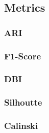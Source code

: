 \subsection{Metrics}

\subsubsection{ARI}

\subsubsection{F1-Score}

\subsubsection{DBI}

\subsubsection{Silhoutte}

\subsubsection{Calinski}
